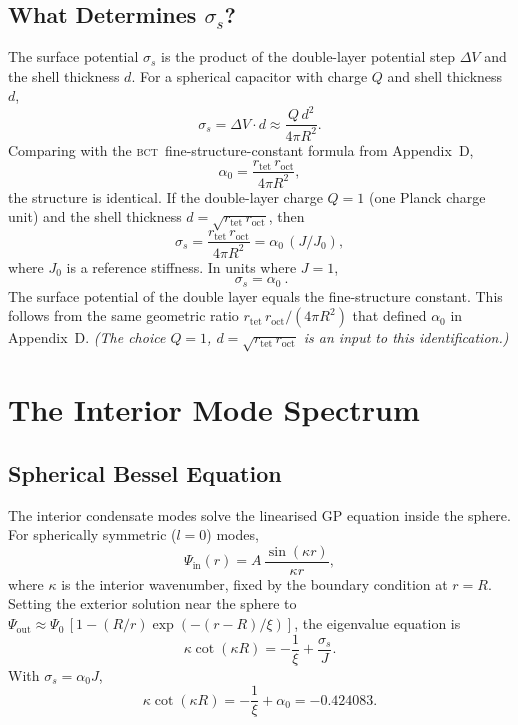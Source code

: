 \documentclass[aps,prl,preprint,superscriptaddress,floatfix]{revtex4-2}
\newcommand{\roct}{r_{\mathrm{oct}}}
\newcommand{\rtet}{r_{\mathrm{tet}}}
\newcommand{\az}{\alpha_0}
\newcommand{\BCT}{\textsc{bct}}
\newcommand{\Rsph}{R}
\begin{document}
\subsection{What Determines $\sigma_s$?}

The surface potential $\sigma_s$ is the product of the double-layer potential
step $\Delta V$ and the shell thickness $d$. For a spherical capacitor with
charge $Q$ and shell thickness $d$,
\begin{equation}
  \sigma_s = \Delta V \cdot d \approx \frac{Q\,d^2}{4\pi \Rsph^2}.
  \label{eq:sigma}
\end{equation}
Comparing with the \BCT\ fine-structure-constant formula from Appendix~D,
\begin{equation}
  \az = \frac{\rtet\,\roct}{4\pi \Rsph^2},
  \label{eq:alpha0}
\end{equation}
the structure is identical. If the double-layer charge $Q=1$ (one Planck charge
unit) and the shell thickness $d=\sqrt{\rtet\,\roct}$, then
\begin{equation}
  \sigma_s = \frac{\rtet\,\roct}{4\pi \Rsph^2} = \az\,(J/J_0),
\end{equation}
where $J_0$ is a reference stiffness. In units where $J=1$,
\begin{equation}
  \boxed{\ \sigma_s = \az\ }.
\end{equation}
The surface potential of the double layer equals the fine-structure constant.
This follows from the same geometric ratio $\rtet\,\roct/(4\pi \Rsph^2)$ that
defined $\az$ in Appendix~D. \emph{(The choice $Q=1$, $d=\sqrt{\rtet\,\roct}$ is
an input to this identification.)}

\section{The Interior Mode Spectrum}
\label{sec:spectrum}

\subsection{Spherical Bessel Equation}

The interior condensate modes solve the linearised GP equation inside the
sphere. For spherically symmetric ($l=0$) modes,
\begin{equation}
  \Psi_{\mathrm{in}}(r) = A\,\frac{\sin(\kappa r)}{\kappa r},
\end{equation}
where $\kappa$ is the interior wavenumber, fixed by the boundary condition at
$r=\Rsph$. Setting the exterior solution near the sphere to
$\Psi_{\mathrm{out}} \approx \Psi_0\,[1-(\Rsph/r)\exp(-(r-\Rsph)/\xi)]$, the
eigenvalue equation is
\begin{equation}
  \kappa\cot(\kappa \Rsph) = -\frac{1}{\xi} + \frac{\sigma_s}{J}.
\end{equation}
With $\sigma_s = \az J$,
\begin{equation}
  \kappa\cot(\kappa \Rsph) = -\frac{1}{\xi} + \az = -0.424083.
\end{equation}
\end{document}
